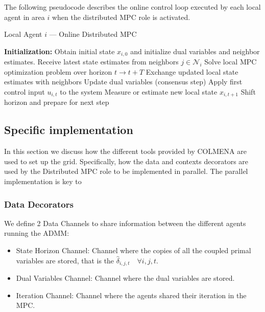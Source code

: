 \documentclass{article}
\begin{document}
The following pseudocode describes the online control loop executed by each local agent in area $i$ when the distributed MPC role is activated.

\begin{algorithm}[H]
\caption{Local Agent $i$ — Online Distributed MPC}
\begin{algorithmic}[1]
\State \textbf{Initialization:} Obtain initial state $x_{i,0}$ and initialize dual variables and neighbor estimates.
        \State Receive latest state estimates from neighbors $j \in \mathcal{N}_i$
        \State Solve local MPC optimization problem over horizon $t \rightarrow t+T$
        \State Exchange updated local state estimates with neighbors
        \State Update dual variables (consensus step)
    \EndWhile
    \State Apply first control input $u_{i,t}$ to the system
    \State Measure or estimate new local state $x_{i,t+1}$
    \State Shift horizon and prepare for next step
\EndWhile
\end{algorithmic}
\end{algorithm}

\subsection*{Specific implementation}

In this section we discuss how the different tools provided by COLMENA are used to set up the grid. Specifically, how the data and contexts decorators are used by the Distributed MPC role to be implemented in parallel. The parallel implementation is key to 

\subsubsection*{Data Decorators}

We define 2 Data Channels to share information between the different agents running the ADMM:

\begin{itemize}
    \item State Horizon Channel: Channel where the copies of all the coupled primal variables are stored, that is the $\hat{\delta}_{i,j,t} \quad \forall i,j,t$.
    \item Dual Variables Channel: Channel where the dual variables are stored.
    \item Iteration Channel: Channel where the agents shared their iteration in the MPC.
\end{itemize}
\end{document}
